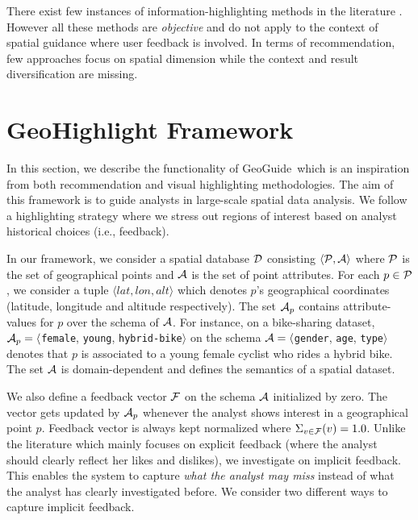 \documentclass{vldb}
\newcommand{\framework}{{\sc GeoGuide}}
\begin{document}
There exist few instances of information-highlighting methods in the literature \cite{Liang2010,Robinson2011,wongsuphasawat2016voyager,willett2007scented}. However all these methods are {\em objective} and do not apply to the context of spatial guidance where user feedback is involved.  In terms of recommendation, few approaches focus on spatial dimension \cite{Bao2015,Levandoski:2012} while the context and result diversification are missing.

\section{GeoHighlight Framework}
\label{sec:pb}
In this section, we describe the functionality of \framework\ which is an inspiration from both recommendation \cite{Omidvar-Tehrani:2015} and visual highlighting \cite{Liang2010,Robinson2011} methodologies. The aim of this framework is to guide analysts in large-scale spatial data analysis. We follow a highlighting strategy where we stress out regions of interest based on analyst historical choices (i.e., feedback).

In our framework, we consider a spatial database ${\cal D}$ consisting $\langle {\cal P}, {\cal A} \rangle$ where ${\cal P}$ is the set of
geographical points and ${\cal A}$ is the set of point attributes. For each $p \in {\cal P}$, we consider a tuple $\langle lat, lon, alt\rangle$ which denotes $p$'s geographical coordinates (latitude, longitude and altitude respectively). The set ${\cal A}_p$ contains attribute-values for $p$ over the schema of ${\cal A}$. For instance, on a bike-sharing dataset, ${\cal A}_p = \langle${\tt female}, {\tt young}, {\tt hybrid-bike}$\rangle$ on the schema ${\cal A} = \langle${\tt gender}, {\tt age}, {\tt type}$\rangle$ denotes that $p$ is associated to a young female cyclist who rides a hybrid bike. The set ${\cal A}$ is domain-dependent and defines the semantics of a spatial dataset.

We also define a feedback vector ${\cal F}$ on the schema ${\cal A}$ initialized by zero. The vector gets updated by ${\cal A}_p$ whenever the analyst shows interest in a geographical point $p$. Feedback vector is always kept normalized where $\Sigma_{v \in {\cal F}}(v) = 1.0$. Unlike the literature which mainly focuses on explicit feedback (where the analyst should clearly reflect her likes and dislikes), we investigate on implicit feedback. This enables the system to capture {\em what the analyst may miss} instead of what the analyst has clearly investigated before. We consider two different ways to capture implicit feedback.
\end{document}
